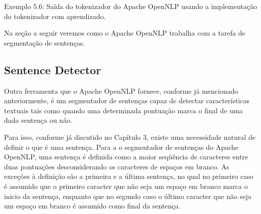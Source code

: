 \documentclass[11pt]{report}
\begin{document}
\begin{quote}
                 
             
     \fbox{,}                    \fbox{,}                   \fbox{,}            
   
\end{quote}
\begin{center}
  Exemplo 5.6: Saída do tokenizador do Apache OpenNLP usando a implementação do tokenizador com aprendizado.
\end{center}

Na seção a seguir veremos como o Apache OpenNLP trabalha com a tarefa de segmentação de sentenças.

\subsection{Sentence Detector}

\indent\indent Outra ferramenta que o Apache OpenNLP fornece, conforme já mencionado anteriormente, é um segmentador de sentenças capaz de detectar características textuais
tais como quando uma determinada pontuação marca o final de uma dada sentença ou não.

Para isso, conforme já discutido no Capítulo 3, existe uma
necessidade natural de definir o que é uma sentença. Para a o segmentador de sentenças do Apache OpenNLP, uma sentença é definida como a maior seqüência de caracteres entre duas
pontuações desconsiderando os caracteres de espaços em branco. As exceções à definição são a primeira e a última sentença, no qual no primeiro caso é assumido que o primeiro caracter que não
seja um espaço em branco marca o inicio da sentença, enquanto que no segundo caso o último caracter que não seja um espaço em branco é assumido como final da sentença.
\end{document}
